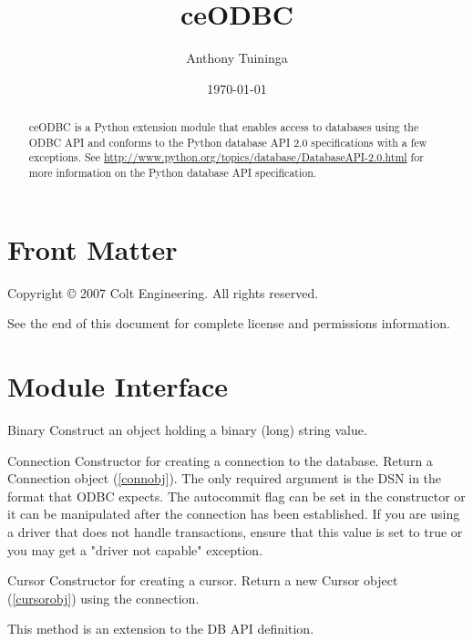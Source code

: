 \documentclass{manual}
\title{ceODBC}
\author{Anthony Tuininga}
\date{\today}                   %
\begin{document}
\maketitle

\ifhtml
\chapter*{Front Matter\label{front}}
\fi

Copyright \copyright{} 2007 Colt Engineering.
All rights reserved.

See the end of this document for complete license and permissions
information.

\begin{abstract}

\noindent
ceODBC is a Python extension module that enables access to databases using the
ODBC API and conforms to the Python database API 2.0 specifications with a few
exceptions.
See \url{http://www.python.org/topics/database/DatabaseAPI-2.0.html} for more
information on the Python database API specification.

\end{abstract}

\tableofcontents

\chapter{Module Interface\label{module}}

\begin{funcdesc}{Binary}{}
  Construct an object holding a binary (long) string value.
\end{funcdesc}

\begin{funcdesc}{Connection}{}
  Constructor for creating a connection to the database. Return a Connection
  object (\ref{connobj}). The only required argument is the DSN in the format
  that ODBC expects. The autocommit flag can be set in the constructor or it
  can be manipulated after the connection has been established. If you are
  using a driver that does not handle transactions, ensure that this value is
  set to true or you may get a "driver not capable" exception.
\end{funcdesc}

\begin{funcdesc}{Cursor}{}
  Constructor for creating a cursor.  Return a new Cursor object
  (\ref{cursorobj}) using the connection.

   This method is an extension to the DB API definition.
\end{funcdesc}
\end{document}
